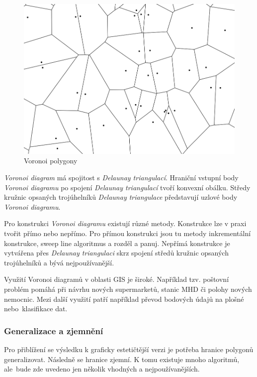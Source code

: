 \begin{figure}[H] \centering
    \includegraphics[width=400pt]{./pictures/voronoi.png}
    \caption[Voronoi polygony]{Voronoi polygony}
	\label{fig:voronoi}              
\end{figure}   

\textit{Voronoi diagram} má spojitost s \textit{Delaunay triangulací}. Hraniční vstupní body
\textit{Voronoi diagramu} po spojení \textit{Delaunay triangulací} tvoří konvexní obálku.
Středy kružnic opsaných trojúhelníků \textit{Delaunay triangulace} představují uzlové body
\textit{Voro\-noi diagramu}.

Pro konstrukci \textit{Voronoi diagramu} existují různé metody. Konstrukce lze v praxi tvořit přímo nebo nepřímo.
Pro přímou konstrukci jsou tu metody inkrementální konstrukce, sweep line algoritmus a
rozděl a panuj. Nepřímá konstrukce je vytvářena přes \textit{Delaunay triangulaci} skrz spojení středů
kružnic opsaných trojúhelníků a bývá nejpoužívanější. 

Využití Voronoi diagramů v oblasti GIS je široké. Například tzv. poštovní problém
pomáhá při návrhu nových supermarketů, stanic MHD či polohy nových nemocnic.
Mezi další využití patří například převod bodových údajů na plošné
nebo~klasifikace dat. \cite{bayer-voronoi}

\subsubsection{Generalizace a zjemnění}
\label{generalizace_zjemneni}

Pro přiblížení se výsledku k graficky estetičtější verzi je potřeba hranice polygonů
generalizovat. Následně se hranice zjemní. K tomu existuje mnoho algoritmů, ale~bude zde uvedeno
jen několik vhodných a nejpoužívanějších.

